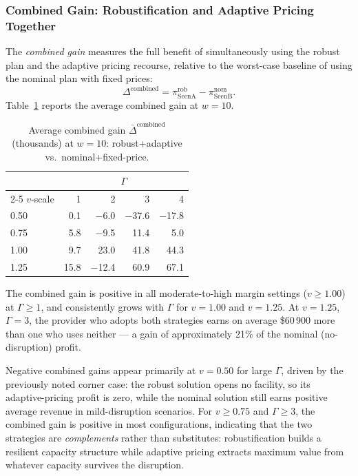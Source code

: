 \subsubsection*{Combined Gain: Robustification and Adaptive Pricing Together}

The \emph{combined gain} measures the full benefit of simultaneously
using the robust plan and the adaptive pricing recourse, relative to the
worst-case baseline of using the nominal plan with fixed prices:
\[
  \Delta^{\mathrm{combined}} = \pi^{\mathrm{rob}}_{\mathrm{ScenA}}
  - \pi^{\mathrm{nom}}_{\mathrm{ScenB}}.
\]
Table~\ref{tab:combined} reports the average combined gain at $w = 10$.

\begin{table}[htbp]
\centering
\caption{Average combined gain $\bar\Delta^{\mathrm{combined}}$
         (thousands) at $w = 10$: robust+adaptive vs.\
         nominal+fixed-price.}
\label{tab:combined}
\setlength{\tabcolsep}{6pt}
\begin{tabular}{lrrrr}
\toprule
& \multicolumn{4}{c}{$\Gamma$} \\
\cmidrule(lr){2-5}
$v$-scale & 1 & 2 & 3 & 4 \\
\midrule
0.50 &   0.1 &  $-$6.0 & $-$37.6 & $-$17.8 \\
0.75 &   5.8 &  $-$9.5 &  11.4  &   5.0  \\
1.00 &   9.7 &  23.0   &  41.8  &  44.3  \\
1.25 &  15.8 & $-$12.4 &  60.9  &  67.1  \\
\bottomrule
\end{tabular}
\end{table}

The combined gain is positive in all moderate-to-high margin settings
($v \geq 1.00$) at $\Gamma \geq 1$, and consistently grows with
$\Gamma$ for $v = 1.00$ and $v = 1.25$.
At $v = 1.25$, $\Gamma = 3$, the provider who adopts both strategies
earns on average \$60\,900 more than one who uses neither — a gain of
approximately 21\% of the nominal (no-disruption) profit.

Negative combined gains appear primarily at $v = 0.50$ for large
$\Gamma$, driven by the previously noted corner case: the robust
solution opens no facility, so its adaptive-pricing profit is zero,
while the nominal solution still earns positive average revenue in
mild-disruption scenarios.
For $v \geq 0.75$ and $\Gamma \geq 3$, the combined gain is positive
in most configurations, indicating that the two strategies are
\emph{complements} rather than substitutes: robustification builds a
resilient capacity structure while adaptive pricing extracts maximum
value from whatever capacity survives the disruption.

